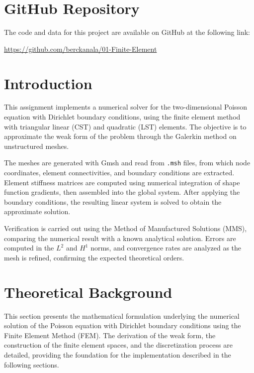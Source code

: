 \documentclass[12pt]{article}
\begin{document}
\thispagestyle{empty}
\newpage
{}
\setcounter{page}{1}

\newpage
\section*{GitHub Repository}

The code and data for this project are available on GitHub at the following link:
\begin{center}
    \url{https://github.com/berckanala/01-Finite-Element}
\end{center}


\newpage
\section{Introduction}

This assignment implements a numerical solver for the two-dimensional Poisson equation with Dirichlet boundary conditions, using the finite element method with triangular linear (CST) and quadratic (LST) elements. The objective is to approximate the weak form of the problem through the Galerkin method on unstructured meshes.

The meshes are generated with Gmsh and read from \texttt{.msh} files, from which node coordinates, element connectivities, and boundary conditions are extracted. Element stiffness matrices are computed using numerical integration of shape function gradients, then assembled into the global system. After applying the boundary conditions, the resulting linear system is solved to obtain the approximate solution.

Verification is carried out using the Method of Manufactured Solutions (MMS), comparing the numerical result with a known analytical solution. Errors are computed in the $L^2$ and $H^1$ norms, and convergence rates are analyzed as the mesh is refined, confirming the expected theoretical orders.

\newpage
\section{Theoretical Background}

This section presents the mathematical formulation underlying the numerical solution of the Poisson equation with Dirichlet boundary conditions using the Finite Element Method (FEM). The derivation of the weak form, the construction of the finite element spaces, and the discretization process are detailed, providing the foundation for the implementation described in the following sections.
\end{document}
